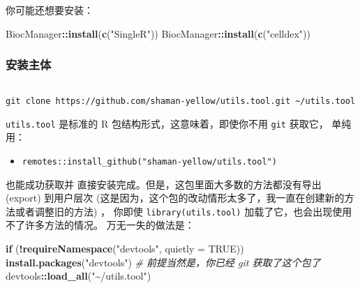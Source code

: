 \documentclass[
]{article}
\newenvironment{Shaded}{\begin{snugshade}}{\end{snugshade}}
\newcommand{\CommentTok}[1]{\textcolor[rgb]{0.56,0.35,0.01}{\textit{#1}}}
\newcommand{\ControlFlowTok}[1]{\textcolor[rgb]{0.13,0.29,0.53}{\textbf{#1}}}
\newcommand{\DataTypeTok}[1]{\textcolor[rgb]{0.13,0.29,0.53}{#1}}
\newcommand{\KeywordTok}[1]{\textcolor[rgb]{0.13,0.29,0.53}{\textbf{#1}}}
\newcommand{\NormalTok}[1]{#1}
\newcommand{\OperatorTok}[1]{\textcolor[rgb]{0.81,0.36,0.00}{\textbf{#1}}}
\newcommand{\OtherTok}[1]{\textcolor[rgb]{0.56,0.35,0.01}{#1}}
\newcommand{\StringTok}[1]{\textcolor[rgb]{0.31,0.60,0.02}{#1}}
\providecommand{\tightlist}{%
  \setlength{\itemsep}{0pt}\setlength{\parskip}{0pt}}
\begin{document}
你可能还想要安装：

\begin{Shaded}
\begin{Highlighting}[]
\NormalTok{BiocManager}\OperatorTok{::}\KeywordTok{install}\NormalTok{(}\KeywordTok{c}\NormalTok{(}\StringTok{"SingleR"}\NormalTok{))}
\NormalTok{BiocManager}\OperatorTok{::}\KeywordTok{install}\NormalTok{(}\KeywordTok{c}\NormalTok{(}\StringTok{"celldex"}\NormalTok{))}
\end{Highlighting}
\end{Shaded}

\hypertarget{ux5b89ux88c5ux4e3bux4f53}{%
\subsubsection{安装主体}\label{ux5b89ux88c5ux4e3bux4f53}}

\begin{tcolorbox}[colback = gray!10, colframe = red!50, width = 16cm, arc = 1mm, auto outer arc, title = {Bash input}]
\begin{verbatim}

git clone https://github.com/shaman-yellow/utils.tool.git ~/utils.tool

\end{verbatim}
\end{tcolorbox}

\texttt{utils.tool} 是标准的 R 包结构形式，这意味着，即使你不用 \texttt{git} 获取它，
单纯用：

\begin{itemize}
\tightlist
\item
  \texttt{remotes::install\_github("shaman-yellow/utils.tool")}
\end{itemize}

也能成功获取并 直接安装完成。但是，这包里面大多数的方法都没有导出 (export) 到用户层次
(这是因为，这个包的改动情形太多了，我一直在创建新的方法或者调整旧的方法) ，
你即使 \texttt{library(utils.tool)} 加载了它，也会出现使用不了许多方法的情况。
万无一失的做法是：

\begin{Shaded}
\begin{Highlighting}[]
\ControlFlowTok{if}\NormalTok{ (}\OperatorTok{!}\KeywordTok{requireNamespace}\NormalTok{(}\StringTok{"devtools"}\NormalTok{, }\DataTypeTok{quietly =} \OtherTok{TRUE}\NormalTok{))}
  \KeywordTok{install.packages}\NormalTok{(}\StringTok{"devtools"}\NormalTok{)}
\CommentTok{\# 前提当然是，你已经 git 获取了这个包了}
\NormalTok{devtools}\OperatorTok{::}\KeywordTok{load\_all}\NormalTok{(}\StringTok{"\textasciitilde{}/utils.tool"}\NormalTok{)}
\end{Highlighting}
\end{Shaded}
\end{document}
